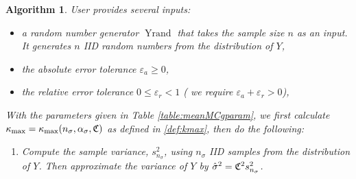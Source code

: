 \documentclass{iitthesis}
\DeclareMathOperator{\Yrand}{Yrand}
\newtheorem{algorithm}[theorem]{Algorithm}
\theoremstyle{definition}
\begin{document}
\begin{algorithm}\label{alg:meanMCg} 
User provides several inputs:
\begin{itemize}
\item a random number generator $\Yrand$ that takes the sample size $n$ as an input. It generates $n$ IID random numbers from the distribution of $Y$,
\item the absolute error tolerance $\varepsilon_a \geq 0$,
\item the relative error tolerance $0 \leq \varepsilon_r <1$ ( we require $\varepsilon_a+\varepsilon_r >0$),
\end{itemize}

With the parameters given in Table \ref{table:meanMCgparam}, we first calculate $\kappa_{\max}=\kappa_{\max}(n_\sigma,\alpha_\sigma,\mathfrak{C})$ as defined in \eqref{def:kmax}, then do the following:
\begin{enumerate}
\item Compute the sample variance, $s^2_{n_{\sigma}}$, using $n_\sigma$ IID samples from the distribution of $Y$. Then approximate the variance of $Y$ by $\hat{\sigma}^2 = \mathfrak{C}^2 s^2_{n_\sigma}$. 

\end{enumerate}
\end{algorithm}
\end{document}
